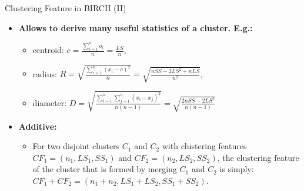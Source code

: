\begin{frame}{Clustering Feature in BIRCH (II)}
	\begin{itemize}
		\item \textbf{Allows to derive many useful statistics of a cluster. E.g.:}
		      \begin{itemize}
			      \item centroid: $c = \frac{\sum_{i=1}^{n}o_i}{n} = \frac{LS}{n}$,
			      \item radius: $R = \sqrt{\frac{\sum_{i=1}^{n}(x_i-c)^2}{n}} = \sqrt{\frac{nSS-2LS^2+nLS}{n^2}}$,
			      \item diameter: $D = \sqrt{\frac{\sum_{i=1}^{n}\sum_{j=1}^{n}(x_i-x_j)^2}{n(n-1)}} = \sqrt{\frac{2nSS-2LS^2}{n(n-1)}}$
		      \end{itemize}
		\item \textbf{Additive:}
		      \begin{itemize}
			      \item For two disjoint clusters $C_1$ and $C_2$ with clustering
			            features $CF_1 = (n_1, LS_1, SS_1)$ and $CF_2 = (n_2, LS_2, SS_2)$,
			            the clustering feature of the cluster that is formed by merging
			            $C_1$ and $C_2$ is simply: $CF_1 + CF_2 = (n_1 + n_2, LS_1 + LS_2, SS_1 + SS_2)$.
		      \end{itemize}
	\end{itemize}
\end{frame}

